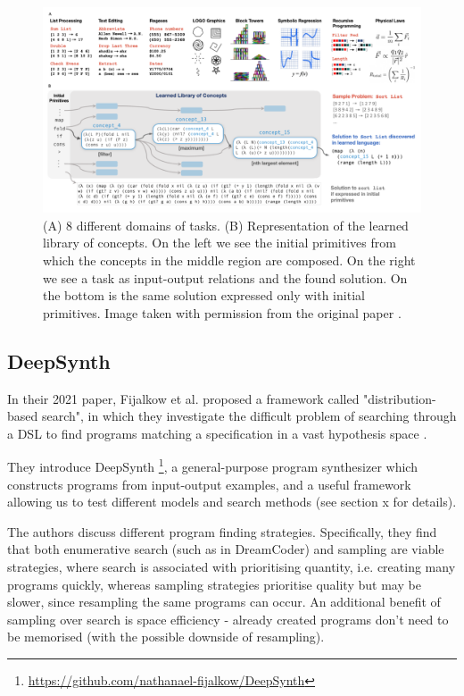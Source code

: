 \begin{figure}[h]
    \centering
    \includegraphics[width=\textwidth]{../img/conc_library.png}
    \caption{(A) 8 different domains of tasks. (B) Representation of the learned library of concepts. On the left we see the initial primitives from which the concepts in the middle region are composed. On the right we see a task as input-output relations and the found solution. On the bottom is the same solution expressed only with initial primitives. Image taken with permission from the original paper \cite{ellis_dreamcoder_2021}.}
    \label{fig:conc_library}
\end{figure}


\subsection{DeepSynth}

In their 2021 paper, Fijalkow et al. proposed a framework called "distribution-based search", in which they investigate the difficult problem of searching through a DSL to find programs matching a specification in a vast hypothesis space \cite{fijalkow_scaling_2021}.

They introduce DeepSynth \footnote{\url{https://github.com/nathanael-fijalkow/DeepSynth}}, a general-purpose program synthesizer which constructs programs from input-output examples, and a useful framework allowing us to test different models and search methods (see section x for details).

The authors discuss different program finding strategies. Specifically, they find that both enumerative search (such as in DreamCoder) and sampling are viable strategies, where search is associated with prioritising quantity, i.e.  creating many programs quickly, whereas sampling strategies prioritise quality but may be slower, since resampling the same programs can occur. An additional benefit of sampling over search is space efficiency - already created programs don't need to be memorised (with the possible downside of resampling).

